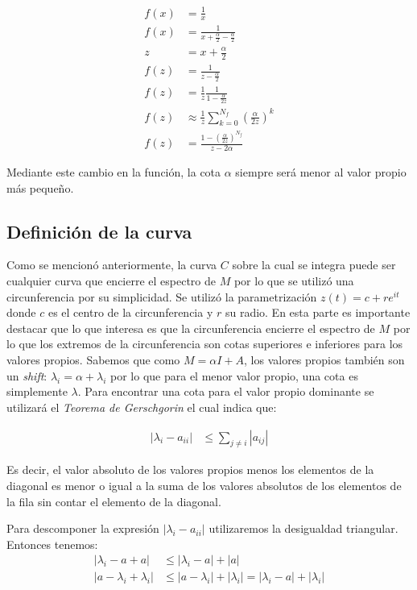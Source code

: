 \documentclass[fleqn]{article}
\begin{document}
\begin{align*}
    f(x) &= \frac{1}{x} \\
    f(x) &= \frac{1}{x+\frac{\alpha}{2} - \frac{\alpha}{2}}\\
    z &= x+\frac{\alpha}{2}\\
    f(z) &= \frac{1}{z-\frac{\alpha}{2}} \\
    f(z) &= \frac{1}{z}\frac{1}{1-\frac{\alpha}{2z}}\\
    f(z) &\approx \frac{1}{z}\sum_{k=0}^{N_{f}}(\frac{\alpha}{2z})^k\\
    f(z) &= \displaystyle{\frac{1-(\frac{\alpha}{2z})^{N_{f}}}{z-2\alpha}}
\end{align*}

Mediante este cambio en la función, la cota $\alpha$ siempre será menor al valor propio más pequeño.\\


\subsection{Definición de la curva}
Como se mencionó anteriormente, la curva $C$ sobre la cual se integra puede ser cualquier curva que encierre el espectro de $M$ por lo que se utilizó una circunferencia por su simplicidad. Se utilizó la parametrización $z(t) = c + re^{it}$ donde $c$ es el centro de la circunferencia y $r$ su radio. En esta parte es importante destacar que lo que interesa es que la circunferencia encierre el espectro de $M$ por lo que los extremos de la circunferencia son cotas superiores e inferiores para los valores propios. Sabemos que como $M = \alpha I + A$, los valores propios también son un \textit{shift}: $\hat{\lambda}_i = \alpha + \lambda_i$ por lo que para el menor valor propio, una cota es simplemente $\lambda$. Para encontrar una cota para el valor propio dominante se utilizará el \textit{Teorema de Gerschgorin} el cual indica que:

\begin{align*}
    |\lambda_i - a_{ii}| &\leq \sum_{j \neq i}|a_{ij}| 
\end{align*}

Es decir, el valor absoluto de los valores propios menos los elementos de la diagonal es menor o igual a la suma de los valores absolutos de los elementos de la fila sin contar el elemento de la diagonal.

Para descomponer la expresión $|\lambda_i - a_{ii}|$ utilizaremos la desigualdad triangular. Entonces tenemos:
\begin{align}
    |\lambda_i - a + a| &\leq |\lambda_i - a| + |a| \\
    |a - \lambda_i + \lambda_i| &\leq |a - \lambda_i| + |\lambda_i| = |\lambda_i - a| + |\lambda_i|
\end{align}
\end{document}
